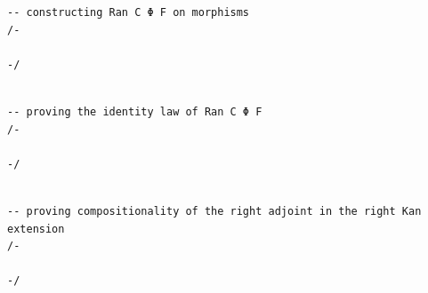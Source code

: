 \documentclass{book}
\theoremstyle{definition}
\newcounter{lcounter}
\begin{document}
{{\begin{center}
\begin{tcolorbox}[width=5in,colback={white},title={\begin{center}\texttt{Lean \thelcounter} \addtocounter{lcounter}{1}  \end{center}},colbacktitle=Blue,coltitle=black]
\begin{verbatim}
-- constructing Ran C Φ F on morphisms
/-

-/

\end{verbatim}
\end{tcolorbox}
\end{center}


\begin{center}
\begin{tcolorbox}[width=5in,colback={white},title={\begin{center}\texttt{Lean \thelcounter} \addtocounter{lcounter}{1}  \end{center}},colbacktitle=Blue,coltitle=black]
\begin{verbatim}

-- proving the identity law of Ran C Φ F
/-

-/

\end{verbatim}
\end{tcolorbox}
\end{center}


\begin{center}
\begin{tcolorbox}[width=5in,colback={white},title={\begin{center}\texttt{Lean \thelcounter} \addtocounter{lcounter}{1}  \end{center}},colbacktitle=Blue,coltitle=black]
\begin{verbatim}

-- proving compositionality of the right adjoint in the right Kan extension
/-

-/

\end{verbatim}
\end{tcolorbox}
\end{center}


\begin{center}
\begin{tcolorbox}[width=5in,colback={white},title={\begin{center}\texttt{Lean \thelcounter} \addtocounter{lcounter}{1}  \end{center}},colbacktitle=Blue,coltitle=black]
\begin{verbatim}


\end{verbatim}
\end{tcolorbox}
\end{center}}}
\end{document}
